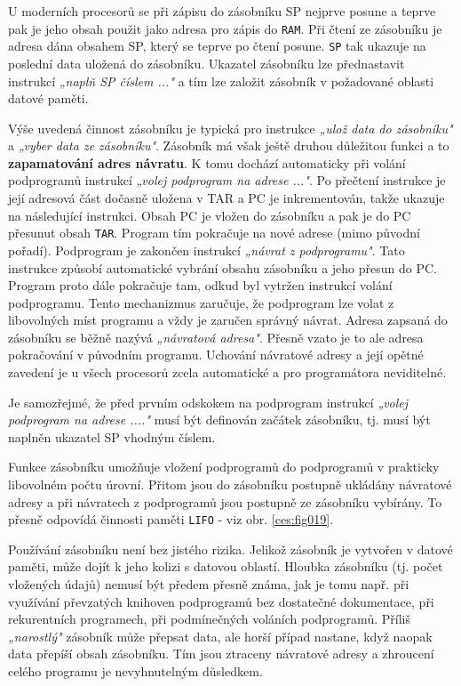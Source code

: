     
    U moderních procesorů se při zápisu do zásobníku SP nejprve posune a teprve pak je jeho obsah 
    použit jako adresa pro zápis do \texttt{RAM}. Při čtení ze zásobníku je adresa dána obsahem SP, 
    který se teprve po čtení posune. \texttt{SP} tak ukazuje na poslední data uložená do zásobníku. 
    Ukazatel zásobníku lze přednastavit instrukcí \emph{„naplň SP číslem ..."} a tím lze založit 
    zásobník v požadované oblasti datové paměti.
    
    Výše uvedená činnost zásobníku je typická pro instrukce \emph{„ulož data do zásobníku"} a 
    \emph{„vyber data ze zásobníku"}. Zásobník má však ještě druhou důležitou funkci a to 
    \textbf{zapamatování adres návratu}. K tomu dochází automaticky při volání podprogramů 
    instrukcí \emph{„volej podprogram na adrese ..."}. Po přečtení instrukce je její adresová část 
    dočasně uložena v TAR a PC je inkrementován, takže ukazuje na následující instrukci. Obsah PC 
    je vložen do zásobníku a pak je do PC přesunut obsah \texttt{TAR}. Program tím pokračuje na 
    nové adrese (mimo původní pořadí). Podprogram je zakončen instrukcí \emph{„návrat z 
    podprogramu"}. Tato instrukce způsobí automatické vybrání obsahu zásobníku a jeho přesun 
    do PC. Program proto dále pokračuje tam, odkud byl vytržen instrukcí volání podprogramu. Tento 
    mechanizmus zaručuje, že podprogram lze volat z libovolných míst programu a vždy je zaručen 
    správný návrat. Adresa zapsaná do zásobníku se běžně nazývá \emph{„návratová adresa"}. Přesně 
    vzato je to ale adresa pokračování v původním programu. Uchování návratové adresy a její opětné 
    zavedení je u všech procesorů zcela automatické a pro programátora neviditelné.
    
    Je samozřejmé, že před prvním odskokem na podprogram instrukcí \emph{„volej podprogram na 
    adrese ...."} musí být definován začátek zásobníku, tj. musí být naplněn ukazatel SP vhodným 
    číslem.
    
    Funkce zásobníku umožňuje vložení podprogramů do podprogramů v prakticky libovolném počtu 
    úrovní. Přitom jsou do zásobníku postupně ukládány návratové adresy a při návratech z 
    podprogramů jsou postupně ze zásobníku vybírány. To přesně odpovídá činnosti paměti 
    \texttt{LIFO} - viz obr. \ref{ces:fig019}.
    
    Používání zásobníku není bez jistého rizika. Jelikož zásobník je vytvořen v datové paměti, může 
    dojít k jeho kolizi s datovou oblastí. Hloubka zásobníku (tj. počet vložených údajů) nemusí být 
    předem přesně známa, jak je tomu např. při využívání převzatých knihoven podprogramů bez 
    dostatečné dokumentace, při rekurentních programech, při podmínečných voláních podprogramů. 
    Příliš \emph{„narostlý"} zásobník může přepsat data, ale horší případ nastane, když naopak data 
    přepíší obsah zásobníku. Tím jsou ztraceny návratové adresy a zhroucení celého programu je 
    nevyhnutelným důsledkem.    
    
